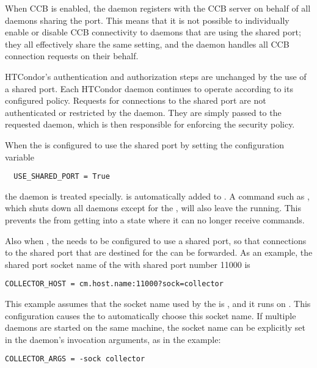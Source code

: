 When CCB is enabled,
the  daemon registers with
the CCB server on behalf of all daemons sharing the port.
This means that it is not possible to individually enable or disable
CCB connectivity to daemons that are using the shared port;
they all effectively share the same setting,
and the  daemon handles all CCB connection
requests on their behalf.

HTCondor's authentication and authorization steps are unchanged by the
use of a shared port.  Each HTCondor daemon continues to operate
according to its configured policy.  Requests for connections to the
shared port are not authenticated or restricted by
the  daemon.
They are simply passed to the requested daemon,
which is then responsible for enforcing the security policy.

When the  is configured to use the shared port
by setting the configuration variable
\begin{verbatim}
  USE_SHARED_PORT = True
\end{verbatim}
the  daemon is treated specially. 
 is automatically added to .
A command such as ,
which shuts down all daemons except for the ,
will also leave the  running.
This prevents the  from getting into a state
where it can no longer receive commands.

Also when ,
the  needs to be configured to use a shared port,
so that connections to the shared port that are destined for 
the  can be forwarded.
As an example,
the shared port socket name of the 
with shared port number 11000 is

\footnotesize
\begin{verbatim}
COLLECTOR_HOST = cm.host.name:11000?sock=collector
\end{verbatim}
\normalsize

This example assumes that the socket name used by 
the  is ,
and it runs on .
This configuration causes the  to automatically choose this 
socket name.
If multiple  daemons are started on the same machine,
the socket name can be explicitly set in the daemon's invocation arguments,
as in the example:

\begin{verbatim}
COLLECTOR_ARGS = -sock collector
\end{verbatim}

